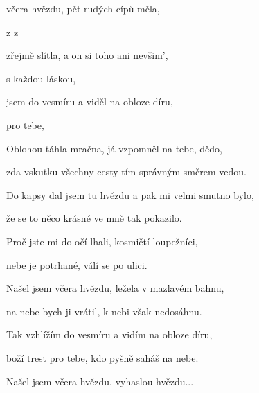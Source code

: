 

\zs
{} včera hvězdu, pět rudých cípů měla,

 z  z 

 zřejmě slítla, a on si toho ani nevšim',

 s každou láskou,  
\ks

\zr
{} jsem do vesmíru a viděl na obloze díru,

 pro tebe,  
\kr

\zs
Oblohou táhla mračna, já vzpomněl na tebe, dědo,

zda vskutku všechny cesty tím správným směrem vedou.

Do kapsy dal jsem tu hvězdu a pak mi velmi smutno bylo,

že se to něco krásné ve mně tak pokazilo.
\ks

\zr\kr

\zs
Proč jste mi do očí lhali, kosmičtí loupežníci,

nebe je potrhané, válí se po ulici.

Našel jsem včera hvězdu, ležela v mazlavém bahnu,

na nebe bych ji vrátil, k nebi však nedosáhnu.
\ks

\zr
Tak vzhlížím do vesmíru a vidím na obloze díru,

boží trest pro tebe, kdo pyšně saháš na nebe.
\kr

Našel jsem včera hvězdu, vyhaslou hvězdu...

\kp
